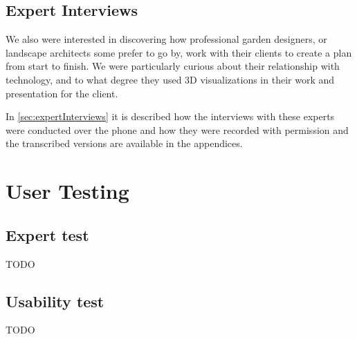\subsection{Expert Interviews}
We also were interested in discovering how professional garden designers, or landscape architects some prefer to go by, work with their clients to create a plan from start to finish. We were particularly curious about their relationship with technology, and to what degree they used 3D visualizations in their work and presentation for the client. 

In \autoref{sec:expertInterviews} it is described how the interviews with these experts were conducted over the phone and how they were recorded with permission and the transcribed versions are available in the appendices. 

\section{User Testing}

\subsection{Expert test}
TODO
\subsection{Usability test}
TODO

